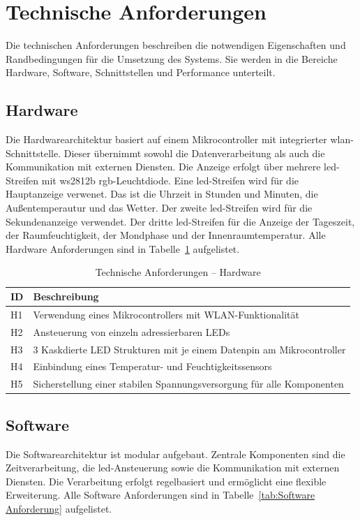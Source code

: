 \section{Technische Anforderungen}
Die technischen Anforderungen beschreiben die notwendigen Eigenschaften und Randbedingungen für die Umsetzung des Systems.
Sie werden in die Bereiche Hardware, Software, Schnittstellen und Performance unterteilt.

\subsection{Hardware}
Die Hardwarearchitektur basiert auf einem Mikrocontroller mit integrierter \gls{wlan}-Schnittstelle.
Dieser übernimmt sowohl die Datenverarbeitung als auch die Kommunikation mit externen Diensten.
Die Anzeige erfolgt über mehrere \gls{led}-Streifen mit \gls{ws2812b} \gls{rgb}-Leuchtdiode.
Eine \gls{led}-Streifen wird für die Hauptanzeige verwenet. Das ist die Uhrzeit in Stunden und Minuten, die Außentemperautur und das Wetter.
Der zweite \gls{led}-Streifen wird für die Sekundenanzeige verwendet.
Der dritte \gls{led}-Streifen für die Anzeige der Tageszeit, der Raumfeuchtigkeit, der Mondphase und der Innenraumtemperatur.
Alle Hardware Anforderungen sind in Tabelle~\ref{tab:Hardware Anforderung} aufgelistet.

\begin{table}[H]
\centering
\begin{tabular}{p{3cm} p{9cm}}
\textbf{ID} & \textbf{Beschreibung} \\
\hline
H1 & Verwendung eines Mikrocontrollers mit WLAN-Funktionalität \\
H2 & Ansteuerung von einzeln adressierbaren LEDs \\
H3 & 3 Kaskdierte LED Strukturen mit je einem Datenpin am Mikrocontroller \\
H4 & Einbindung eines Temperatur- und Feuchtigkeitssensors \\
H5 & Sicherstellung einer stabilen Spannungsversorgung für alle Komponenten \\
\end{tabular}
\caption{Technische Anforderungen – Hardware}
\label{tab:Hardware Anforderung}
\end{table}

\subsection{Software}
Die Softwarearchitektur ist modular aufgebaut.
Zentrale Komponenten sind die Zeitverarbeitung, die \gls{led}-Ansteuerung sowie die Kommunikation mit externen Diensten.
Die Verarbeitung erfolgt regelbasiert und ermöglicht eine flexible Erweiterung.
Alle Software Anforderungen sind in Tabelle~\ref{tab:Software Anforderung} aufgelistet.


